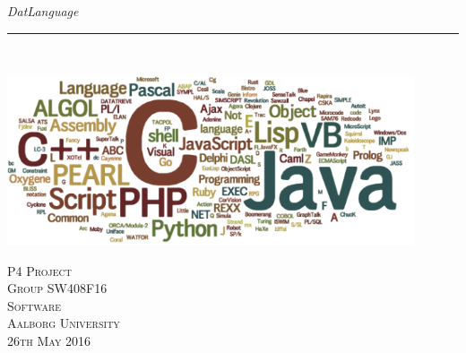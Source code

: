 \thispagestyle{empty}
\begin{flushright}
\vspace{3cm}

\phantom{hul}

\phantom{hul}

\phantom{hul}

\textsl{\Huge DatLanguage} \\ \vspace{1cm}

\rule{13cm}{3mm} \\ \vspace{1.5cm}
\vspace{1cm}

\includegraphics[width=0.9\textwidth]{billeder/Prog-languages}

\vspace{7cm} 
\textsc{\Large P4 Project \\
Group SW408F16 \\
Software\\
Aalborg University\\
26th May 2016\\}
\end{flushright}
